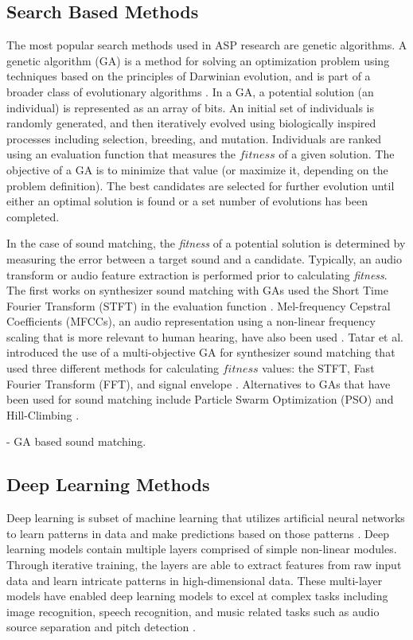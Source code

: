 \subsection{Search Based Methods}
The most popular search methods used in ASP research are genetic algorithms. A genetic algorithm (GA) is a method for solving an optimization problem using techniques based on the principles of Darwinian evolution, and is part of a broader class of evolutionary algorithms \cite{whitley1994genetic}. In a GA, a potential solution (an individual) is represented as an array of bits. An initial set of individuals is randomly generated, and then iteratively evolved using biologically inspired processes including selection, breeding, and mutation. Individuals are ranked using an evaluation function that measures the $fitness$ of a given solution. The objective of a GA is to minimize that value (or maximize it, depending on the problem definition). The best candidates are selected for further evolution until either an optimal solution is found or a set number of evolutions has been completed.

In the case of sound matching, the \textit{fitness} of a potential solution is determined by measuring the error between a target sound and a candidate. Typically, an audio transform or audio feature extraction is performed prior to calculating \textit{fitness}. The first works on synthesizer sound matching with GAs used the Short Time Fourier Transform (STFT) in the evaluation function \cite{horner1993machine, horner1995wavetable}. Mel-frequency Cepstral Coefficients (MFCCs), an audio representation using a non-linear frequency scaling that is more relevant to human hearing, have also been used \cite{yee2008synthbot, roth2011comparison, macret2014automatic, smith2017play}. Tatar et al. introduced the use of a multi-objective GA for synthesizer sound matching that used three different methods for calculating $fitness$ values: the STFT, Fast Fourier Transform (FFT), and signal envelope \cite{tatar2016automatic}. Alternatives to GAs that have been used for sound matching include Particle Swarm Optimization (PSO) \cite{heise2009automatic} and Hill-Climbing \cite{roth2011comparison, luke2019stochastic}.

\cite{masudo2021quality} - GA based sound matching.

\subsection{Deep Learning Methods}
Deep learning is subset of machine learning that utilizes artificial neural networks to learn patterns in data and make predictions based on those patterns \cite{lecun2015deep}. Deep learning models contain multiple layers comprised of simple non-linear modules. Through iterative training, the layers are able to extract features from raw input data and learn intricate patterns in high-dimensional data. These multi-layer models have enabled deep learning models to excel at complex tasks including image recognition, speech recognition, and music related tasks such as audio source separation \cite{spleeter2019} and pitch detection \cite{kim2018crepe}.

